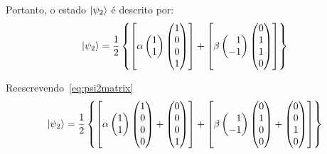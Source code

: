 Portanto, o estado $\ket{\psi_2}$ é descrito por:
\begin{align}\label{eq:psi2matrix}
\ket{\psi_2} = \frac{1}{2} \left\{\left[ \alpha \begin{pmatrix}
1 \\
1 
\end{pmatrix} \begin{pmatrix}
1 \\
0 \\
0 \\
1
\end{pmatrix}\right] + \left[\beta \begin{pmatrix*}[r]
1 \\
-1
\end{pmatrix*} \begin{pmatrix}
0 \\
1 \\
1 \\
0
\end{pmatrix}\right]\right\}
\end{align}

Reescrevendo~\eqref{eq:psi2matrix}
\begin{equation}\label{eq:psi2aberto}
\ket{\psi_2} = \frac{1}{2} \left\{\left[ \alpha \begin{pmatrix}
1 \\
1 
\end{pmatrix} \begin{pmatrix}
1 \\
0 \\
0 \\
0
\end{pmatrix} +\begin{pmatrix}
0 \\
0 \\
0 \\
1
\end{pmatrix} \right] + \left[\beta \begin{pmatrix*}[r]
1 \\
-1
\end{pmatrix*} \begin{pmatrix}
0 \\
1 \\
0 \\
0
\end{pmatrix} + \begin{pmatrix}
0 \\
0 \\
1 \\
0
\end{pmatrix}\right]\right\}
\end{equation}


